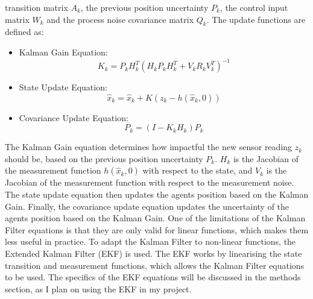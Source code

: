 \documentclass[12pt]{article}
\begin{document}
transition matrix \(A_{k}\), the previous position uncertainty \(P_{k}\), the control input matrix \(W_{k}\) and the process noise covariance matrix \(Q_{k}\). The update functions are
defined as:
\begin{itemize}
    \item Kalman Gain Equation:
    \begin{equation}
        K_k = P_{k} H_k^T (H_k P_{k} H_k^T + V_k R_k V_k^T)^{-1}
    \end{equation}
    \item State Update Equation:
    \begin{equation}
        \hat{x}_{k} = \hat{x}_{k} + K(z_k - h(\hat{x}_{k}, 0))
    \end{equation}
    \item Covariance Update Equation:
    \begin{equation}
        P_{k} = (I - K_k H_k) P_k
    \end{equation}
\end{itemize}
The Kalman Gain equation determines how impactful the new sensor reading \(z_k\) should be, based on the previous position uncertainty \(P_{k}\). \(H_k\) is the Jacobian of the
measurement function \(h(\hat{x}_{k}, 0)\) with respect to the state, and \(V_k\) is the Jacobian of the measurement function with respect to the measurement noise. The state update
equation then updates the agents position based on the Kalman Gain. Finally, the covariance update equation updates the uncertainty of the agents position based on the Kalman Gain.
One of the limitations of the Kalman Filter equations is that they are only valid for linear functions, which makes them less useful in practice. To adapt the Kalman Filter to
non-linear functions, the Extended Kalman Filter (EKF) is used. The EKF works by linearising the state transition and measurement functions, which allows the Kalman Filter equations
to be used. The specifics of the EKF equations will be discussed in the methods section, as I plan on using the EKF in my project.\\
\end{document}
